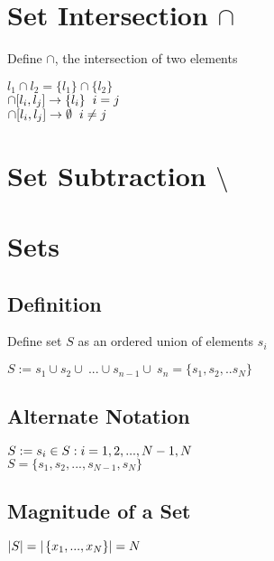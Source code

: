 \documentclass[11pt]{article}
\begin{document}
\section{Set Intersection $\cap$}
Define $\cap$, the intersection of two elements
\begin{center}
$l_1 \cap l_2 = \{l_1\} \cap\{ l_2\}$
\\ \vspace{2mm}
$\cap \lbrack l_i,l_j\rbrack \rightarrow \{l_i\} \hspace{2mm} i = j$
\\
$\cap \lbrack l_i,l_j\rbrack \rightarrow \emptyset \hspace{2mm} i \neq j$
\end{center}


\section{Set Subtraction $\setminus$}


\section{Sets}




\subsection{Definition}
Define set $S$ as an ordered union of elements $s_i$

\begin{center}
$
S :=   s_1 \cup  s_2 \cup\ ... \cup s_{n-1} \cup\ s_n = \{s_1,s_2,..s_N\}
$
\end{center}
\subsection{Alternate Notation}
\begin{center}
$
S := s_i \in  S :  i=1,2,...,N-1,N \hspace{5mm}$
\\$
S = \{s_1,s_2,...,s_{N-1},s_N\}
$

\end{center}





\subsection{Magnitude of a Set}
\begin{center}
$
|S| = |\hspace{.5mm} \{x_1,...,x_N\}| = N
$
\end{center}
\end{document}
